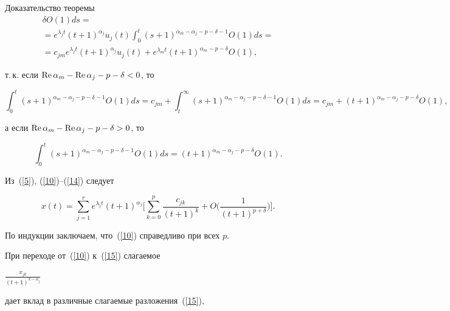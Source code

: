 \begin{pf*}{Доказательство теоремы}
\begin{multline}
{\delta}O (1)ds=\\


%


=e^{\lambda_jt}(t+1)^{\alpha_{j}} u_j (t)


\int_0^t (s+1)^{\alpha_{m}-\alpha_{j}-p-\delta-1}O (1)ds=\\


%


=c_{jm}e^{\lambda_jt}(t+1)^{\alpha_{j}} u_j (t)


+e^{\lambda_m t}(t+1)^{\alpha_{m}-p-\delta}O (1),


\end{multline}


т.\,к. если $\operatorname{Re} \alpha_{m}-\operatorname{Re} \alpha_{j}-p-\delta<0$, то


$$


\int_0^t (s+1)^{\alpha_{m}-\alpha_{j}-p-\delta-1}O (1)ds=


c_{jm}+\int_t^\infty (s+1)^{\alpha_{m}-\alpha_{j}-p-\delta-1}


O (1)ds=


c_{jm}+(t+1)^{\alpha_{m}-\alpha_{j}-p-\delta} O (1),


$$


а если $\operatorname{Re} \alpha_{m}-\operatorname{Re} \alpha_{j}-p-\delta>0$, то


$$


\int_0^t (s+1)^{\alpha_{m}-\alpha_{j}-p-\delta-1}O (1)ds


=(t+1)^{\alpha_{m}-\alpha_{j}-p-\delta} O (1).


$$


Из~(\ref{5}), (\ref{10})--(\ref{14}) следует


\begin{equation}


\label{15}


x(t)=\sum\limits_{j=1}^{r} e^{\lambda_jt}(t+1)^{\alpha_{j}} \bigg[


\sum\limits_{k=0}^{p}\frac{c_{jk}}{(t+1)^{k}}+


O \bigg(\frac1{(t+1)^{p+\delta}} \bigg) \bigg].


\end{equation}


По индукции заключаем, что~(\ref{10}) справедливо при всех $p$.





При переходе от~(\ref{10}) к~(\ref{15}) слагаемое 


$\frac {x_{jk}} { (t+1)^{k-\alpha_j}}$


дает вклад в различные слагаемые разложения~(\ref{15}),



\end{pf*}
